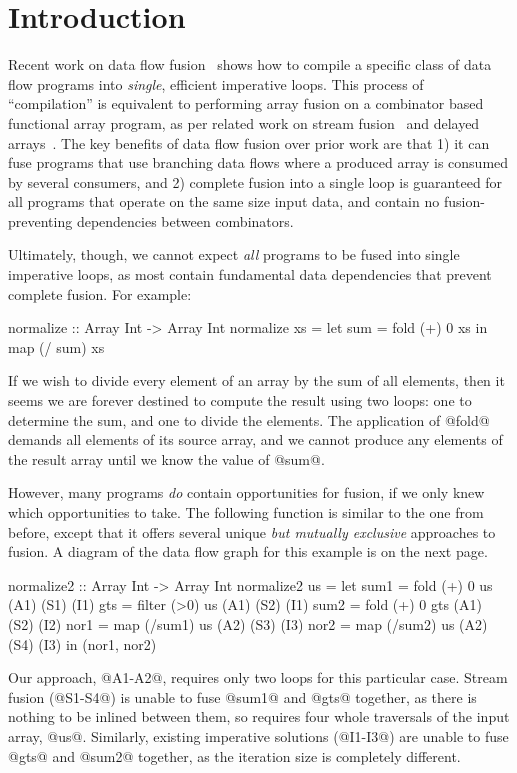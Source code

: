 \section{Introduction}

Recent work on data flow fusion~\cite{lippmeier2013flow} shows how to compile a specific class of data flow programs into \emph{single}, efficient imperative loops.
This process of ``compilation'' is equivalent to performing array fusion on a combinator based functional array program, as per related work on stream fusion~\cite{coutts2007streamfusion} and delayed arrays~\cite{keller2010repa}.
The key benefits of data flow fusion over prior work are that 1) it can fuse programs that use branching data flows where a produced array is consumed by several consumers, and 2) complete fusion into a single loop is guaranteed for all programs that operate on the same size input data, and contain no fusion-preventing dependencies between combinators.


Ultimately, though, we cannot expect \emph{all} programs to be fused into single imperative loops, as most contain fundamental data dependencies that prevent complete fusion. For example:
\begin{code}
  normalize :: Array Int -> Array Int
  normalize xs = let sum = fold (+) 0 xs
                 in  map (/ sum) xs
\end{code}

If we wish to divide every element of an array by the sum of all elements, then it seems we are forever destined to compute the result using two loops: one to determine the sum, and one to divide the elements.
The application of @fold@ demands all elements of its source array, and we cannot produce any elements of the result array until we know the value of @sum@.

However, many programs \emph{do} contain opportunities for fusion, if we only knew which opportunities to take.
The following function is similar to the one from before, except that it offers several unique \emph{but mutually exclusive} approaches to fusion.
A diagram of the data flow graph for this example is on the next page.

\begin{code}
 normalize2 :: Array Int -> Array Int
 normalize2 us
  = let sum1 = fold   (+) 0 us      (A1) (S1) (I1)
        gts  = filter (>0)  us      (A1) (S2) (I1)
        sum2 = fold   (+) 0 gts     (A1) (S2) (I2)
        nor1 = map  (/sum1) us      (A2) (S3) (I3)
        nor2 = map  (/sum2) us      (A2) (S4) (I3)
    in (nor1, nor2)
\end{code}
Our approach, @A1-A2@, requires only two loops for this particular case.
Stream fusion (@S1-S4@) is unable to fuse @sum1@ and @gts@ together, as there is nothing to be inlined between them, so requires four whole traversals of the input array, @us@.
Similarly, existing imperative solutions (@I1-I3@) are unable to fuse @gts@ and @sum2@ together, as the iteration size is completely different.

